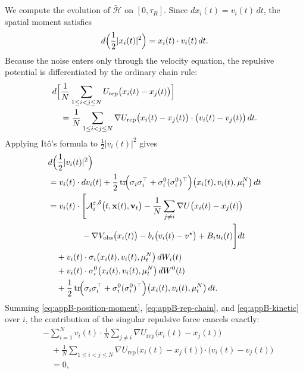 \documentclass[pdflatex,sn-mathphys-num]{sn-jnl}%
\numberwithin{equation}{section}
\theoremstyle{thmstyleone}%
\theoremstyle{remark}
\theoremstyle{definition}
\newcommand{\vstar}{v^{\star}}
\begin{document}
We compute the evolution of $\widetilde{\mathscr H}$ on $[0,\tau_R]$.
Since $dx_i(t)=v_i(t)\,dt$, the spatial moment satisfies
\begin{equation}\label{eq:appB-position-moment}
  d\Bigl(\frac12|x_i(t)|^2\Bigr)
  =
  x_i(t)\cdot v_i(t)\,dt.
\end{equation}
Because the noise enters only through the velocity equation, the
repulsive potential is differentiated by the ordinary chain rule:
\begin{equation}\label{eq:appB-rep-chain}
\begin{aligned}
  &d\Bigl[
    \frac1N\sum_{1\le i<j\le N}
    U_{\mathrm{rep}}\bigl(x_i(t)-x_j(t)\bigr)
  \Bigr] \\
  &\quad =
  \frac1N\sum_{1\le i<j\le N}
  \nabla U_{\mathrm{rep}}\bigl(x_i(t)-x_j(t)\bigr)\cdot
  \bigl(v_i(t)-v_j(t)\bigr)\,dt.
\end{aligned}
\end{equation}
Applying It\^o's formula to $\frac12|v_i(t)|^2$ gives
\begin{equation}\label{eq:appB-kinetic}
\begin{aligned}
  &d\Bigl(\frac12|v_i(t)|^2\Bigr) \\
  &= v_i(t)\cdot dv_i(t)  + \frac12
  \operatorname{tr}\!\Bigl(
    \sigma_i\sigma_i^\top
    + \sigma_i^0(\sigma_i^0)^\top
  \Bigr)\bigl(x_i(t),v_i(t),\mu_t^N\bigr)\,dt \\
  &= v_i(t)\cdot
  \Biggl[
    \mathcal A_i^{\varepsilon,\delta}\bigl(t,\mathbf{x}(t),\mathbf{v}_t\bigr) 
    - \frac1N\sum_{j\neq i}\nabla U\bigl(x_i(t)-x_j(t)\bigr) \\
  &\qquad\qquad
    - \nabla V_{\mathrm{obs}}\bigl(x_i(t)\bigr)
    - b_i\bigl(v_i(t)-\vstar\bigr)
    + B_i u_i(t)
  \Biggr]dt \\
  &\quad
  + v_i(t)\cdot
    \sigma_i\bigl(x_i(t),v_i(t),\mu_t^N\bigr)\,dW_i(t) \\
  &\quad
  + v_i(t)\cdot
    \sigma_i^0\bigl(x_i(t),v_i(t),\mu_t^N\bigr)\,dW^0(t) \\
  &\quad
  + \frac12
  \operatorname{tr}\!\Bigl(
    \sigma_i\sigma_i^\top
    + \sigma_i^0(\sigma_i^0)^\top
  \Bigr)\bigl(x_i(t),v_i(t),\mu_t^N\bigr)\,dt.
\end{aligned}
\end{equation}
Summing \eqref{eq:appB-position-moment}, \eqref{eq:appB-rep-chain}, and
\eqref{eq:appB-kinetic} over $i$, the contribution of the singular
repulsive force cancels exactly:
\begin{equation}\label{eq:appB-cancel}
\begin{aligned}
  &-\sum_{i=1}^N
    v_i(t)\cdot \frac1N\sum_{j\neq i}
    \nabla U_{\mathrm{rep}}\bigl(x_i(t)-x_j(t)\bigr) \\
  &\quad +
  \frac1N\sum_{1\le i<j\le N}
  \nabla U_{\mathrm{rep}}\bigl(x_i(t)-x_j(t)\bigr)\cdot
  \bigl(v_i(t)-v_j(t)\bigr) \\
  &\quad = 0,
\end{aligned}
\end{equation}
\end{document}
